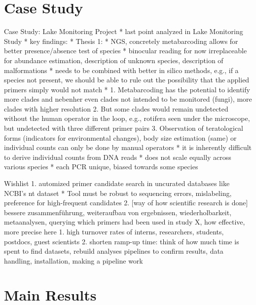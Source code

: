 \documentclass[xcolor=dvipsnames,envcountsect]{beamer}
\begin{document}
\section{Case Study} 
\begin{frame}{Case Study: Lake Monitoring Project}
* last point analyzed in Lake Monitoring Study
* key findings:
* Thesis 1:
    * NGS, concretely metabarcoding allows for better presence/absence test of species
    * binocular reading for now irreplaceable for abundance estimation, description of unknown species, description of malformations
    * needs to be combined with better in silico methods, e.g., if a species not present, we should be able to rule out the possibility that the applied primers simply would not match
*  
    1. Metabarcoding has the potential to identify more clades and nebenher even clades not intended to be monitored (fungi), more clades with higher resolution
    2. But some clades would remain undetected without the human operator in the loop, e.g., rotifera seen under the microscope, but undetected with three different primer pairs
    3. Observation of teratological forms (indicators for environmental changes), body size estimation (same) or individual counts can only be done by manual operators 
        * it is inherently difficult to derive individual counts from DNA reads 
        * does not scale equally across various species
        * each PCR unique, biased towards some species
\end{frame}

\begin{frame}{Wishlist}
1. automized primer candidate search in uncurated databases like NCBI’s nt dataset
    * Tool must be robust to sequencing errors, mislabeling, preference for high-frequent candidates
2. [way of how scientific research is done] bessere zusammenführung, weiteraufbau von ergebnissen, wiederholbarkeit, metaanalysen, querying which primers had been used in study X, how effective, more precise here
    1. high turnover rates of interns, researchers, students, postdocs, guest scientists
    2. shorten ramp-up time: think of how much time is spent to find datasets, rebuild analyses pipelines to confirm results, data handling, installation, making a pipeline work

\end{frame}

\section{Main Results}
\end{document}
